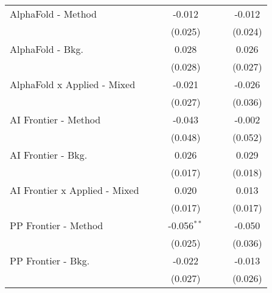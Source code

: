 \begin{tabular}{lcccccc}
   AlphaFold - Method             &             &               & -0.012         &              &               & -0.012\\   
                                  &             &               & (0.025)        &              &               & (0.024)\\   
   AlphaFold - Bkg.               &             &               & 0.028          &              &               & 0.026\\   
                                  &             &               & (0.028)        &              &               & (0.027)\\   
   AlphaFold x Applied - Mixed    &             &               & -0.021         &              &               & -0.026\\   
                                  &             &               & (0.027)        &              &               & (0.036)\\   
   AI Frontier - Method           &             &               & -0.043         &              &               & -0.002\\   
                                  &             &               & (0.048)        &              &               & (0.052)\\   
   AI Frontier - Bkg.             &             &               & 0.026          &              &               & 0.029\\   
                                  &             &               & (0.017)        &              &               & (0.018)\\   
   AI Frontier x Applied - Mixed  &             &               & 0.020          &              &               & 0.013\\   
                                  &             &               & (0.017)        &              &               & (0.017)\\   
   PP Frontier - Method           &             &               & -0.056$^{**}$  &              &               & -0.050\\   
                                  &             &               & (0.025)        &              &               & (0.036)\\   
   PP Frontier - Bkg.             &             &               & -0.022         &              &               & -0.013\\   
                                  &             &               & (0.027)        &              &               & (0.026)\\   

\end{tabular}
